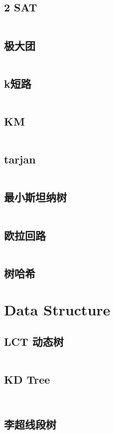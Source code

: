 \documentclass[titlepage, a4paper]{article}
\begin{document}
\begin{multicols}{2}
\begin{spacing}{0.6}
				\subsection{2 SAT}
					\inputminted{cpp}{src/Graph/2-SAT.cpp}
				\subsection{极大团}
					\inputminted{cpp}{src/Graph/极大团.cpp}
				\subsection{k短路}
					\inputminted{cpp}{src/Graph/k短路.cpp}
				\subsection{KM}
					\inputminted{cpp}{src/Graph/KM.cpp}
				\subsection{tarjan}
					\inputminted{cpp}{src/Graph/tarjan.cpp}
				\subsection{最小斯坦纳树}
					\inputminted{cpp}{src/Graph/最小斯坦纳树.cpp}
				\subsection{欧拉回路}
					\inputminted{cpp}{src/Graph/欧拉回路.cpp}
				\subsection{树哈希}	
					
			\newpage
			\section{Data Structure}
				\subsection{LCT 动态树}
					\inputminted{cpp}{src/DataStructure/LCT.cpp}
				\subsection{KD Tree}
					\inputminted{cpp}{src/DataStructure/KDT1.cpp}
					\inputminted{cpp}{src/DataStructure/KDT2.cpp}
				\subsection{李超线段树}
					\inputminted{cpp}{src/DataStructure/li-chao-tree.cpp}

\end{spacing}
\end{multicols}
\end{document}
